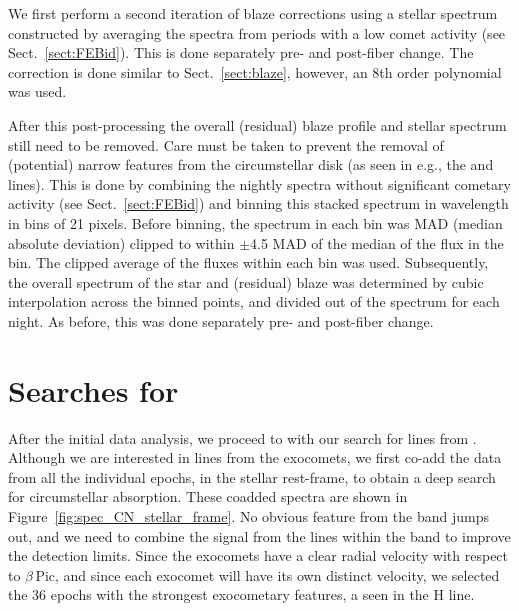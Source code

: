 \documentclass{aa}
\newcommand{\bp}{$\beta$\,Pic}
\begin{document}
We first perform a second iteration of blaze corrections using a stellar spectrum constructed by averaging the spectra from periods with a low comet activity (see Sect.~\ref{sect:FEBid}). %
This is done separately pre- and post-fiber change. The correction is done similar to Sect.~\ref{sect:blaze}, however, %
an 8th order polynomial was used.

After this post-processing the overall (residual) blaze profile and stellar spectrum still need to be removed.
%
Care must be taken to prevent the removal of (potential) narrow features from the circumstellar disk (as seen in e.g., the  and  lines).
%
This is done by combining the nightly spectra without significant cometary activity (see Sect.~\ref{sect:FEBid}) and binning this stacked spectrum in wavelength in bins of 21 pixels.
%
Before binning, the spectrum in each bin was MAD (median absolute deviation) clipped to within $\pm$4.5 MAD of the median of the flux in the bin.
%
The clipped average of the fluxes within each bin was used.
%
Subsequently, the overall spectrum of the star and (residual) blaze was determined by cubic interpolation across the binned points, and divided out of the spectrum for each night.
%
As before, this was done separately pre- and post-fiber change.

\section{Searches for \texorpdfstring{}{CN}}\label{sect:CNsearch}

After the initial data analysis, we proceed to with our search for lines from .
%
Although we are interested in lines from the exocomets, we first co-add the data from all the individual epochs, in the stellar rest-frame, to obtain a deep search for circumstellar  absorption.
%
These coadded spectra %
are shown in Figure~\ref{fig:spec_CN_stellar_frame}.
%
No obvious feature from the  band jumps out, and we need to combine the signal from the lines within the  band to improve the detection limits.
%
Since the exocomets have a clear radial velocity with respect to \bp{}, and since each exocomet will have its own distinct velocity, we selected the 36 epochs with the strongest exocometary features, a seen in the  H line. 
\end{document}
